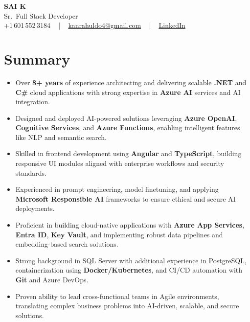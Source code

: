 \documentclass[letterpaper,11pt]{article}
\newcommand{\resumeItem}[1]{
  \item\footnotesize{
    {#1 \vspace{-2pt}}
  }
}
\newcommand{\resumeItemListStart}{\begin{itemize}[leftmargin=*]}
\newcommand{\resumeItemListEnd}{\end{itemize}\vspace{-5pt}}
\begin{document}
\begin{center}
    {\fontsize{14pt}{12pt}\selectfont \textbf{\MakeUppercase{Sai K}}}\\ \vspace{2pt}
    \fontsize{10pt}{12pt}\selectfont Sr.\ Full Stack Developer\\ \vspace{2pt}
    \fontsize{10pt}{12pt}\selectfont +1\,601\,552\,3184 ~ | ~
    \href{mailto:kanrahuldo4@gmail.com}{kanrahuldo4@gmail.com} ~ | ~
    \href{https://www.linkedin.com/in/srrrk/}{\color{blue}\underline{LinkedIn}}
    \vspace{-10pt}
\end{center}

\section{Summary}
\fontsize{9pt}{10pt}\selectfont
\resumeItemListStart
  \resumeItem{Over \textbf{8+ years} of experience architecting and delivering scalable \textbf{.NET} and \textbf{C\#} cloud applications with strong expertise in \textbf{Azure AI} services and AI integration.}
  \resumeItem{Designed and deployed AI-powered solutions leveraging \textbf{Azure OpenAI}, \textbf{Cognitive Services}, and \textbf{Azure Functions}, enabling intelligent features like NLP and semantic search.}
  \resumeItem{Skilled in frontend development using \textbf{Angular} and \textbf{TypeScript}, building responsive UI modules aligned with enterprise workflows and security standards.}
  \resumeItem{Experienced in prompt engineering, model finetuning, and applying \textbf{Microsoft Responsible AI} frameworks to ensure ethical and secure AI deployments.}
  \resumeItem{Proficient in building cloud-native applications with \textbf{Azure App Services}, \textbf{Entra ID}, \textbf{Key Vault}, and implementing robust data pipelines and embedding-based search solutions.}
  \resumeItem{Strong background in SQL Server with additional experience in PostgreSQL, containerization using \textbf{Docker/Kubernetes}, and CI/CD automation with \textbf{Git} and Azure DevOps.}
  \resumeItem{Proven ability to lead cross-functional teams in Agile environments, translating complex business problems into AI-driven, scalable, and secure solutions.}
\resumeItemListEnd
\vspace{-6pt}

\end{document}
